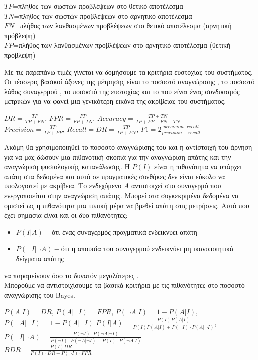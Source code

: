 \begin{center}
$TP$=πλήθος των σωστών προβλέψεων στο θετικό αποτέλεσμα\\
$TN$=πλήθος των σωστών προβλέψεων στο αρνητικό αποτέλεσμα\\
$FN$=πλήθος των λανθασμένων προβλέψεων στο θετικό αποτέλεσμα (αρνητική πρόβλεψη)\\
$FP$=πλήθος των λανθασμένων προβλέψεων στο αρνητικό αποτέλεσμα (θετική πρόβλεψη)\\
\end{center}
Με τις παραπάνω τιμές γίνεται να δομήσουμε τα κριτήρια ευστοχίας του συστήματος. Οι τέσσερις βασικοί άξονες της μέτρησης είναι το ποσοστό αναγνώρισης , το ποσοστό λάθος συναγερμού , το ποσοστό της ευστοχίας  και το  που είναι ένας συνδυασμός μετρικών για να φανεί μια γενικότερη εικόνα της ακρίβειας του συστήματος.
\begin{center}
$DR=\frac{TP}{TP+FN}$, $FPR=\frac{FP}{FP+TN}$, $Accuracy=\frac{TP+TN}{TP+FP+FN+TN}$\\
$Precision=\frac{TP}{TP + FP}$,
$Recall=DR=\frac{TP}{TP + FN}$,
$F1=2\frac{precision \cdotp recall}{precision + recall}$
\end{center}
Ακόμη θα χρησιμοποιηθεί το ποσοστό αναγνώρισης του  και η αντίστοιχή του άρνηση για να μας δώσουν μια πιθανοτική σκοπιά για την αναγνώριση απάτης και την αναγνώριση φυσιολογικής κατανάλωσης. Η $P(I)$ είναι η πιθανότητα να υπάρχει απάτη στα δεδομένα και αυτό σε πραγματικές συνθήκες δεν είναι εύκολο να υπολογιστεί με ακρίβεια. Το ενδεχόμενο $A$ αντιστοιχεί στο συναγερμό που ενεργοποιείται στην αναγνώριση απάτης. Μπορεί στα συγκεκριμένα δεδομένα να οριστεί ως η πιθανότητα μια τυπική μέρα να βρεθεί απάτη στις μετρήσεις. 
Αυτό που έχει σημασία είναι και οι δύο πιθανότητες:
\begin{itemize}
\item $P(I|A)-$ότι ένας συναγερμός πραγματικά ενδεικνύει απάτη
\item $P(\neg{I}|\neg{A})-$ότι η απουσία του συναγερμού ενδεικνύει μη ικανοποιητικά δείγματα απάτης
\end{itemize}
να παραμείνουν όσο το δυνατόν μεγαλύτερες \cite{propab}.\\
Μπορούμε να αντιστοιχίσουμε τα βασικά κριτήρια με τις πιθανότητες στο ποσοστό αναγνώρισης του Bayes.
\begin{center}
$P(A|I)=DR$, $P(A|\neg{I})=FPR$, $P(\neg{A}|I)=1-P(A|I)$, $P(\neg{A}|\neg{I})=1-P(A|\neg{I})$
$P(I|A)=\frac{P(I)P(A|I)}{P(I)P(A|I)+P(\neg{I}) \cdotp P(A|\neg{I})}$, 
$P(\neg{I}|\neg{A})=\frac{P(\neg{I}) \cdotp P(\neg{A}|\neg{I})}{P(\neg{I}) \cdotp P(\neg{A}|\neg{I})+P(I) \cdotp P(\neg{A}|I)}$\\
$BDR=\frac{P(I)DR}{P(I) \cdotp DR+P(\neg{I}) \cdotp FPR}$\\

\end{center}
